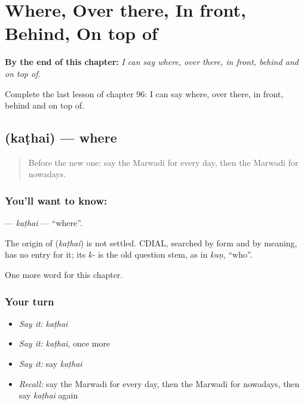 
\chapter{Where, Over there, In front, Behind, On top of}
\label{ch:mw-where-over-there-in-front-behind-on-top-of}

\begin{chapteropening}
\textbf{By the end of this chapter:} \emph{I can say where, over there, in front, behind and on top of.}

Complete the last lesson of chapter 96: I can say where, over there, in front, behind and on top of.
\end{chapteropening}

\section[\texorpdfstring{\mw{कठै} (kaṭhai)}{कठै (kaṭhai)}]{ (kaṭhai) — where}

\label{lesson:MW-C96-kathai}



\begin{quote}
Before the new one: say the Marwadi for every day, then the Marwadi for nowadays.
\end{quote}

\subsection*{You'll want to know: }
\textbf{} — \emph{kaṭhai} — \textquotedblleft{}where\textquotedblright{}.

\begin{cousinweb}
The origin of \textbf{} (\emph{kaṭhai}) is not settled. CDIAL, searched by form and by meaning, has no entry for it; its \emph{k-} is the old question stem, as in \emph{kuṇ}, \textquotedblleft{}who\textquotedblright{}.
\end{cousinweb}

\begin{grammarlens}[title={What you've built}]
One more word for this chapter.
\end{grammarlens}

\subsection*{Your turn}
\begin{itemize}
\raggedright
  \item \emph{Say it:} \emph{kaṭhai}
  \item \emph{Say it:} \emph{kaṭhai}, once more
  \item \emph{Say it:} say \emph{kaṭhai}
  \item \emph{Recall:} say the Marwadi for every day, then the Marwadi for nowadays, then say \emph{kaṭhai} again
\end{itemize}

